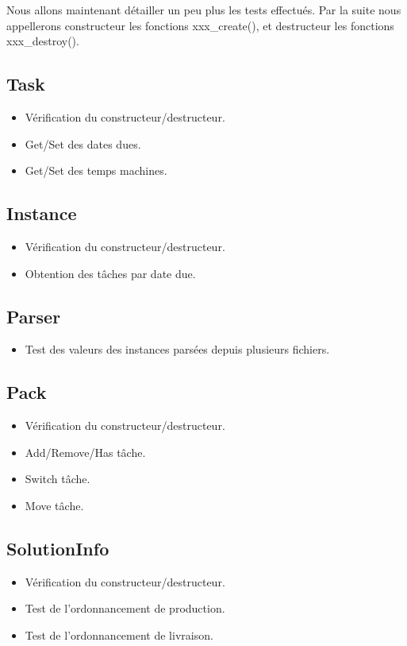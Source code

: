 \documentclass[hideweeklyreports]{polytech/polytech}
\begin{document}
			Nous allons maintenant détailler un peu plus les tests effectués. Par la suite nous appellerons constructeur les fonctions xxx\_create(), et destructeur les fonctions xxx\_destroy().
			\subsection{Task}
				\begin{itemize}
					\item Vérification du constructeur/destructeur.
					\item Get/Set des dates dues.
					\item Get/Set des temps machines.
				\end{itemize}
				
			\subsection{Instance}
				\begin{itemize}
					\item Vérification du constructeur/destructeur.
					\item Obtention des tâches par date due.
				\end{itemize}
				
			\subsection{Parser}
				\begin{itemize}
					\item Test des valeurs des instances parsées depuis plusieurs fichiers.
				\end{itemize}
				
			\subsection{Pack}
				\begin{itemize}
					\item Vérification du constructeur/destructeur.
					\item Add/Remove/Has tâche.
					\item Switch tâche.
					\item Move tâche.
				\end{itemize}
				
			\subsection{SolutionInfo}
				\begin{itemize}
					\item Vérification du constructeur/destructeur.
					\item Test de l'ordonnancement de production.
					\item Test de l'ordonnancement de livraison.
				\end{itemize}
				
\end{document}
